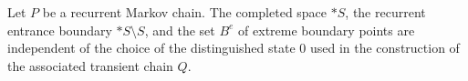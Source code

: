 Let $P$ be a recurrent Markov chain. The completed space $*S$, the recurrent entrance boundary $*S \setminus S$, and the set $B^e$ of extreme boundary points are independent of the choice of the distinguished state $0$ used in the construction of the associated transient chain $Q$.
